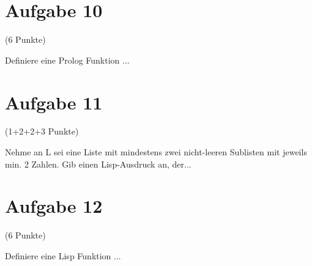\documentclass{exam}
\newcommand{\Punkte}[1]{\begin{flushright}(#1 Punkte)\end{flushright}}
\begin{document}
	
	\clearpage
	\section{Aufgabe 10}
	\Punkte{6}
	
	Definiere eine Prolog Funktion ...
	
	
	\clearpage
	\section{Aufgabe 11}
	\Punkte{1+2+2+3}
	
	Nehme an L sei eine Liste mit mindestens zwei nicht-leeren Sublisten mit jeweils min. 2 Zahlen. Gib einen Lisp-Ausdruck an, der...
	


	\clearpage
	\section{Aufgabe 12}
	\Punkte{6}

	Definiere eine Lisp Funktion ...
\end{document}
